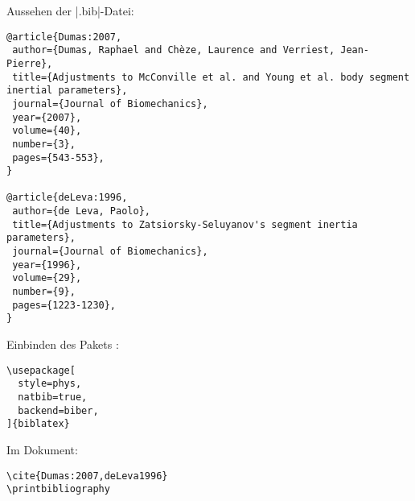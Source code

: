 % 

Aussehen der |.bib|-Datei:
\begin{lstlisting}
@article{Dumas:2007,
 author={Dumas, Raphael and Chèze, Laurence and Verriest, Jean-Pierre},
 title={Adjustments to McConville et al. and Young et al. body segment inertial parameters},
 journal={Journal of Biomechanics},
 year={2007},
 volume={40},
 number={3},
 pages={543-553},
}

@article{deLeva:1996,
 author={de Leva, Paolo},
 title={Adjustments to Zatsiorsky-Seluyanov's segment inertia parameters},
 journal={Journal of Biomechanics},
 year={1996},
 volume={29},
 number={9},
 pages={1223-1230},
}
\end{lstlisting}


\noindent Einbinden des Pakets :
\begin{lstlisting}
\usepackage[
  style=phys,
  natbib=true,
  backend=biber,
]{biblatex}
\end{lstlisting}
Im Dokument:
\begin{lstlisting}
\cite{Dumas:2007,deLeva1996}
\printbibliography
\end{lstlisting}